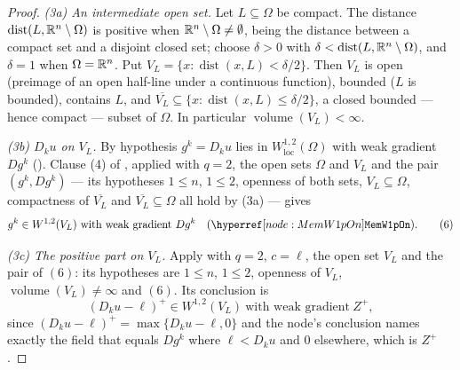 \begin{proof}
\emph{(3a) An intermediate open set.}  Let $L\subseteq\Omega$ be compact.  The
distance $\operatorname{dist}(L,\mathbb{R}^n\setminus\Omega)$ is positive when
$\mathbb{R}^n\setminus\Omega\ne\emptyset$, being the distance between a compact set and
a disjoint closed set; choose $\delta>0$ with
$\delta<\operatorname{dist}(L,\mathbb{R}^n\setminus\Omega)$, and $\delta=1$ when
$\Omega=\mathbb{R}^n$.  Put $V_L=\{x:\operatorname{dist}(x,L)<\delta/2\}$.  Then $V_L$ is
open (preimage of an open half-line under a continuous function), bounded ($L$ is
bounded), contains $L$, and
$\overline{V_L}\subseteq\{x:\operatorname{dist}(x,L)\le\delta/2\}$, a closed
bounded --- hence compact --- subset of $\Omega$.  In particular
$\operatorname{volume}(V_L)<\infty$.

\emph{(3b) $D_ku$ on $V_L$.}  By hypothesis $g^k=D_ku$ lies in
$W^{1,2}_{\mathrm{loc}}(\Omega)$ with weak gradient $Dg^k$
().  Clause (4) of , applied
with $q=2$, the open sets $\Omega$ and $V_L$ and the pair $(g^k,Dg^k)$ --- its
hypotheses $1\le n$, $1\le2$, openness of both sets, $V_L\subseteq\Omega$,
compactness of $\overline{V_L}$ and $\overline{V_L}\subseteq\Omega$ all hold by
(3a) --- gives
\[
g^k\in W^{1,2}(V_L)\ \text{with weak gradient}\ Dg^k\quad(\noderef{MemW1pOn}).
\tag{6}
\]

\emph{(3c) The positive part on $V_L$.}  Apply
 with $q=2$, $c=\ell$, the open set $V_L$ and
the pair of $(6)$: its hypotheses are $1\le n$, $1\le2$, openness of $V_L$,
$\operatorname{volume}(V_L)\ne\infty$ and $(6)$.  Its conclusion is
\[
(D_ku-\ell)^{+}\in W^{1,2}(V_L)\ \text{with weak gradient}\ Z^{+} ,
\tag{7}
\]
since $(D_ku-\ell)^{+}=\max\{D_ku-\ell,0\}$ and the node's conclusion names
exactly the field that equals $Dg^k$ where $\ell<D_ku$ and $0$ elsewhere, which
is $Z^{+}$.


\end{proof}
